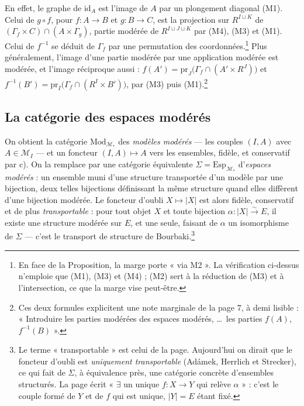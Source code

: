 \documentclass[11pt,a4paper]{article}
\begin{document}
En effet, le graphe de $\mathrm{id}_A$ est l'image de $A$ par un plongement
diagonal (M1). Celui de $g \circ f$, pour $f : A \to B$ et $g : B \to C$, est la
projection sur $R^{I \sqcup K}$ de $(\Gamma_f \times C) \cap (A \times
\Gamma_g)$, partie modérée de $R^{I \sqcup J \sqcup K}$ par (M4), (M3) et
(M1). Celui de $f^{-1}$ se déduit de $\Gamma_f$ par une permutation des
coordonnées.\footnote{En face de la Proposition, la marge porte « via M2 ».
La vérification ci-dessus n'emploie que (M1), (M3) et (M4) ; (M2) sert à la
réduction de (M3) et à l'intersection, ce que la marge vise peut-être.} Plus
généralement, l'image d'une partie modérée par une application modérée est
modérée, et l'image réciproque aussi : $f(A') = \mathrm{pr}_J\bigl(\Gamma_f
\cap (A' \times R^J)\bigr)$ et $f^{-1}(B') = \mathrm{pr}_I\bigl(\Gamma_f \cap
(R^I \times B')\bigr)$, par (M3) puis (M1).\footnote{Ces deux formules
explicitent une note marginale de la page 7, à demi lisible : « Introduire les
parties modérées des espaces modérés, \ldots\ les parties $f(A)$,
$f^{-1}(B)$ ».}

\subsection*{La catégorie des espaces modérés}

On obtient la catégorie $\mathrm{Mod}_{\mathcal{M}_*}$ des \emph{modèles
modérés} — les couples $(I, A)$ avec $A \in \mathcal{M}_I$ — et un foncteur
$(I, A) \mapsto A$ vers les ensembles, fidèle, et conservatif par c). On la
remplace par une catégorie équivalente $\Sigma = \mathrm{Esp}_{\mathcal{M}_*}$
d'\emph{espaces modérés} : un ensemble muni d'une structure transportée d'un
modèle par une bijection, deux telles bijections définissant la même structure
quand elles diffèrent d'une bijection modérée. Le foncteur d'oubli $X \mapsto
|X|$ est alors fidèle, conservatif et de plus \emph{transportable} : pour tout
objet $X$ et toute bijection $\alpha : |X| \xrightarrow{\sim} E$, il existe
une structure modérée sur $E$, et une seule, faisant de $\alpha$ un
isomorphisme de $\Sigma$ — c'est le transport de structure de
Bourbaki.\footnote{Le terme « transportable » est celui de la page.
Aujourd'hui on dirait que le foncteur d'oubli est \emph{uniquement
transportable} (Adámek, Herrlich et Strecker), ce qui fait de $\Sigma$, à
équivalence près, une catégorie concrète d'ensembles structurés. La page
écrit « $\exists$ un unique $f : X \to Y$ qui relève $\alpha$ » : c'est le
couple formé de $Y$ et de $f$ qui est unique, $|Y| = E$ étant fixé.}
\end{document}

